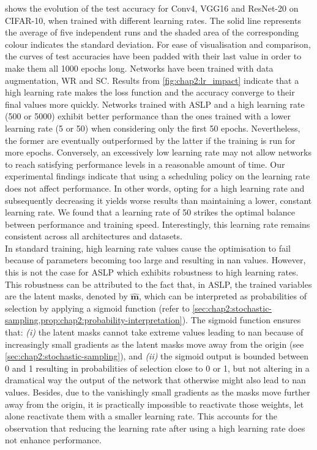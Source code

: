  shows the evolution of the test accuracy for Conv4,
VGG16 and ResNet-20 on CIFAR-10, when trained with different learning rates. The
solid line represents the average of five independent runs and the shaded area
of the corresponding colour indicates the standard deviation. For ease of
visualisation and comparison, the curves of test accuracies have been padded
with their last value in order to make them all 1000 epochs long. Networks have
been trained with data augmentation, \ac{WR} and \ac{SC}. Results from
\cref{fig:chap2:lr_impact} indicate that a high learning rate makes the loss
function and the accuracy converge to their final values more quickly. Networks
trained with \ac{ASLP} and a high learning rate (500 or 5000) exhibit better
performance than the ones trained with a lower learning rate (5 or 50) when
considering only the first 50 epochs. Nevertheless, the former are eventually
outperformed by the latter if the training is run for more epochs. Conversely,
an excessively low learning rate may not allow networks to reach satisfying
performance levels in a reasonable amount of time. Our experimental findings
indicate that using a scheduling policy on the learning rate does not affect
performance. In other words, opting for a high learning rate and subsequently
decreasing it yields worse results than maintaining a lower, constant learning
rate. We found that a learning rate of 50 strikes the optimal balance between
performance and training speed. Interestingly, this learning rate remains
consistent across all architectures and datasets.\\

In standard training, high learning rate values cause the optimisation to fail
because of parameters becoming too large and resulting in \ac{nan} values.
However, this is not the case for \ac{ASLP} which exhibits robustness to high
learning rates. This robustness can be attributed to the fact that, in
\ac{ASLP}, the trained variables are the latent masks, denoted by
$\bm{\hat{m}}$, which can be interpreted as probabilities of selection by
applying a sigmoid function (refer to
\cref{sec:chap2:stochastic-sampling,prop:chap2:probability-interpretation}). The
sigmoid function ensures that: \emph{(i)} the latent masks cannot take extreme
values leading to \ac{nan} because of increasingly small gradients as the latent
masks move away from the origin (see \cref{sec:chap2:stochastic-sampling}), and
\emph{(ii)} the sigmoid output is bounded between 0 and 1 resulting in
probabilities of selection close to 0 or 1, but not altering in a dramatical way
the output of the network that otherwise might also lead to \ac{nan} values.
Besides, due to the vanishingly small gradients as the masks move further away
from the origin, it is practically impossible to reactivate those weights, let
alone reactivate them with a smaller learning rate. This accounts for the
observation that reducing the learning rate after using a high learning rate
does not enhance performance.\\

